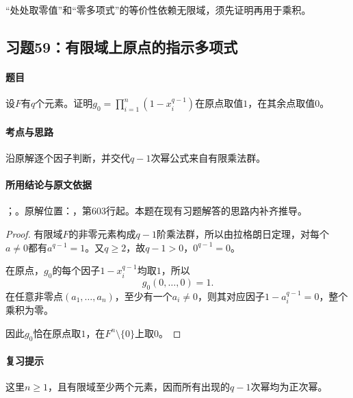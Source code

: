 “处处取零值”和“零多项式”的等价性依赖无限域，须先证明再用于乘积。



\subsection{习题59：有限域上原点的指示多项式}

\label{ex:3:59}

\paragraph{题目}

设$F$有$q$个元素。证明$g_0=\prod_{i=1}^n(1-x_i^{q-1})$在原点取值$1$，在其余点取值$0$。

\paragraph{考点与思路}

沿原解逐个因子判断，并交代$q-1$次幂公式来自有限乘法群。

\paragraph{所用结论与原文依据}

；。原解位置：，第603行起。本题在现有习题解答的思路内补齐推导。


\begin{proof}

有限域$F$的非零元素构成$q-1$阶乘法群，所以由拉格朗日定理，对每个$a\ne0$都有$a^{q-1}=1$。又$q\ge2$，故$q-1>0$，$0^{q-1}=0$。

在原点，$g_0$的每个因子$1-x_i^{q-1}$均取$1$，所以
\[
g_0(0,\ldots,0)=1.
\]
在任意非零点$(a_1,\ldots,a_n)$，至少有一个$a_i\ne0$，则其对应因子$1-a_i^{q-1}=0$，整个乘积为零。

因此$g_0$恰在原点取$1$，在$F^n\setminus\{0\}$上取$0$。

\end{proof}

\paragraph{复习提示}

这里$n\ge1$，且有限域至少两个元素，因而所有出现的$q-1$次幂均为正次幂。




